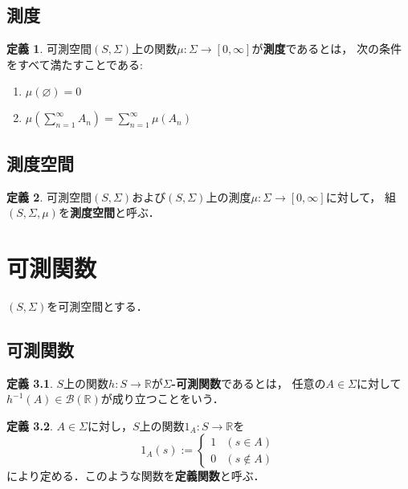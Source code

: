 \documentclass{jsreport}
\theoremstyle{definition}
\newtheorem{defi}{定義}[section]
\begin{document}
\section{測度}

\begin{defi}\label{def_measure}
可測空間$(S,\Sigma)$上の関数$\mu \colon \Sigma\to[0,\infty]$が\textbf{測度}であるとは，
次の条件をすべて満たすことである:
\begin{enumerate}
\item$\mu(\varnothing)=0$
\item$\displaystyle\mu\left(\sum_{n=1}^\infty A_n\right)=\sum_{n=1}^\infty\mu(A_n)$
\end{enumerate}
\end{defi}

\section{測度空間}

\begin{defi}\label{def_measure_space}
可測空間$(S,\Sigma)$および$(S,\Sigma)$上の測度$\mu \colon \Sigma\to[0,\infty]$に対して，
組$(S,\Sigma,\mu)$を\textbf{測度空間}と呼ぶ．
\end{defi}

\chapter{可測関数}

$(S,\Sigma)$を可測空間とする．

\section{可測関数}

\begin{defi}\label{def_measurable_function}
$S$上の関数$h \colon S\to\mathbb{R}$が\textbf{$\Sigma$-可測関数}であるとは，
任意の$A\in\Sigma$に対して$h^{-1}(A)\in\mathcal{B}(\mathbb{R})$が成り立つことをいう．
\end{defi}

\begin{defi}\label{def_indicator_function}
$A\in\Sigma$に対し，$S$上の関数$1_A \colon S\to\mathbb{R}$を
\[ 1_A(s):=\begin{cases}1 & (s \in A) \\ 0 & (s \notin A)\end{cases} \]
により定める．このような関数を\textbf{定義関数}と呼ぶ．
\end{defi}
\end{document}
